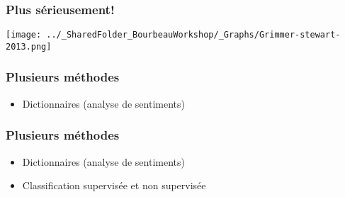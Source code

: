 \documentclass{beamer}
\begin{document}
          
 \begin{frame}
      
       \frametitle{Plus sérieusement!} \vspace{1cm}
      
            \begin{center}
            \texttt{[image: ../\_SharedFolder\_BourbeauWorkshop/\_Graphs/Grimmer-stewart-2013.png]}
       \end{center}
     
\end{frame}
     

\begin{frame}
      
      \frametitle{Plusieurs méthodes} \vspace{1cm}
      
           \begin{itemize}
           
           \item Dictionnaires (analyse de sentiments)
           
      \end{itemize}
           
 \end{frame}


\begin{frame}
      
      \frametitle{Plusieurs méthodes} \vspace{1cm}
      
           \begin{itemize}
           
           \item Dictionnaires (analyse de sentiments)
           
           \item Classification supervisée et non supervisée
           
      \end{itemize}
           
 \end{frame}

          
\end{document}
